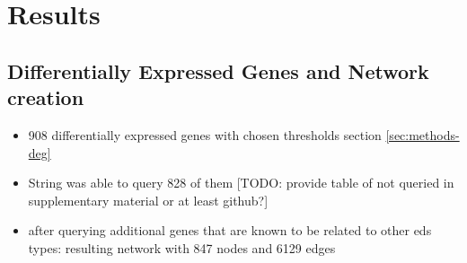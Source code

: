 \section{Results}
\subsection{Differentially Expressed Genes and Network creation}
\begin{itemize}
	\item 908 differentially expressed genes with chosen thresholds section \ref{sec:methods-deg}
	\item String was able to query 828 of them [TODO: provide table of not queried in supplementary material or at least github?]
	\item after querying additional genes that are known to be related to other eds types: resulting network with 847 nodes and 6129 edges
\end{itemize}